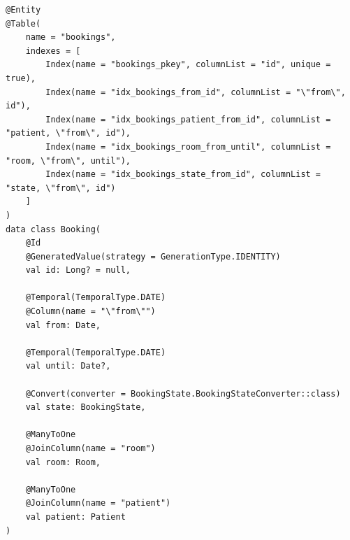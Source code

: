 \begin{lstlisting}[style=kotlinstyle, caption={Optimierte Booking-Entität}]
@Entity
@Table(
    name = "bookings",
    indexes = [
        Index(name = "bookings_pkey", columnList = "id", unique = true),
        Index(name = "idx_bookings_from_id", columnList = "\"from\", id"),
        Index(name = "idx_bookings_patient_from_id", columnList = "patient, \"from\", id"),
        Index(name = "idx_bookings_room_from_until", columnList = "room, \"from\", until"),
        Index(name = "idx_bookings_state_from_id", columnList = "state, \"from\", id")
    ]
)
data class Booking(
    @Id
    @GeneratedValue(strategy = GenerationType.IDENTITY)
    val id: Long? = null,

    @Temporal(TemporalType.DATE)
    @Column(name = "\"from\"")
    val from: Date,

    @Temporal(TemporalType.DATE)
    val until: Date?,

    @Convert(converter = BookingState.BookingStateConverter::class)
    val state: BookingState,

    @ManyToOne
    @JoinColumn(name = "room")
    val room: Room,

    @ManyToOne
    @JoinColumn(name = "patient")
    val patient: Patient
)
\end{lstlisting}